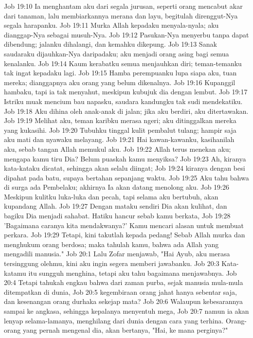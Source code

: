 Job 19:10  Ia menghantam aku dari segala jurusan, seperti orang mencabut akar dari tanaman, lalu membiarkannya merana dan layu, begitulah direnggut-Nya segala harapanku.
Job 19:11  Murka Allah kepadaku menyala-nyala; aku dianggap-Nya sebagai musuh-Nya.
Job 19:12  Pasukan-Nya menyerbu tanpa dapat dibendung; jalanku dihalangi, dan kemahku dikepung.
Job 19:13  Sanak saudaraku dijauhkan-Nya daripadaku; aku menjadi orang asing bagi semua kenalanku.
Job 19:14  Kaum kerabatku semua menjauhkan diri; teman-temanku tak ingat kepadaku lagi.
Job 19:15  Hamba perempuanku lupa siapa aku, tuan mereka; dianggapnya aku orang yang belum dikenalnya.
Job 19:16  Kupanggil hambaku, tapi ia tak menyahut, meskipun kubujuk dia dengan lembut.
Job 19:17  Istriku muak mencium bau napasku, saudara kandungku tak sudi mendekatiku.
Job 19:18  Aku dihina oleh anak-anak di jalan; jika aku berdiri, aku ditertawakan.
Job 19:19  Melihat aku, teman karibku merasa ngeri; aku ditinggalkan mereka yang kukasihi.
Job 19:20  Tubuhku tinggal kulit pembalut tulang; hampir saja aku mati dan nyawaku melayang.
Job 19:21  Hai kawan-kawanku, kasihanilah aku, sebab tangan Allah memukul aku.
Job 19:22  Allah terus menekan aku; mengapa kamu tiru Dia? Belum puaskah kamu menyiksa?
Job 19:23  Ah, kiranya kata-kataku dicatat, sehingga akan selalu diingat;
Job 19:24  kiranya dengan besi dipahat pada batu, supaya bertahan sepanjang waktu.
Job 19:25  Aku tahu bahwa di surga ada Pembelaku; akhirnya Ia akan datang menolong aku.
Job 19:26  Meskipun kulitku luka-luka dan pecah, tapi selama aku bertubuh, akan kupandang Allah.
Job 19:27  Dengan mataku sendiri Dia akan kulihat, dan bagiku Dia menjadi sahabat. Hatiku hancur sebab kamu berkata,
Job 19:28  'Bagaimana caranya kita mendakwanya?' Kamu mencari alasan untuk membuat perkara.
Job 19:29  Tetapi, kini takutlah kepada pedang! Sebab Allah murka dan menghukum orang berdosa; maka tahulah kamu, bahwa ada Allah yang mengadili manusia."
Job 20:1  Lalu Zofar menjawab, "Hai Ayub, aku merasa tersinggung olehmu, kini aku ingin segera memberi jawabanku.
Job 20:3  Kata-katamu itu sungguh menghina, tetapi aku tahu bagaimana menjawabnya.
Job 20:4  Tetapi tahukah engkau bahwa dari zaman purba, sejak manusia mula-mula ditempatkan di dunia,
Job 20:5  kegembiraan orang jahat hanya sebentar saja, dan kesenangan orang durhaka sekejap mata?
Job 20:6  Walaupun kebesarannya sampai ke angkasa, sehingga kepalanya menyentuh mega,
Job 20:7  namun ia akan lenyap selama-lamanya, menghilang dari dunia dengan cara yang terhina. Orang-orang yang pernah mengenal dia, akan bertanya, "Hai, ke mana perginya?"
